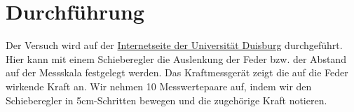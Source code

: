 \section{Durchführung}
\label{sec:Durchführung}
Der Versuch wird auf der \href{http://kallisto.didaktik.physik.uni-due.de/IBEs/Freierfall.php}{Internetseite der Universität Duisburg} durchgeführt. Hier kann mit einem Schieberegler die Auslenkung der Feder bzw. der Abstand auf der Messskala festgelegt werden. Das Kraftmessgerät zeigt die auf die Feder wirkende Kraft an. Wir nehmen 10 Messwertepaare auf, indem wir den Schieberegler in 5cm-Schritten bewegen und die zugehörige Kraft notieren.
